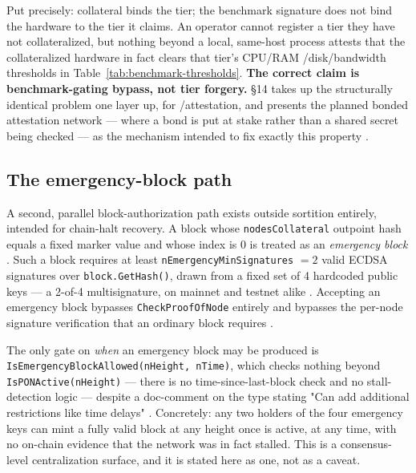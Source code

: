 Put precisely: collateral binds the tier; the benchmark signature does not bind the hardware to the
tier it claims. An operator cannot register a tier they have not collateralized, but nothing beyond a
local, same-host process attests that the collateralized hardware in fact clears that tier's CPU/RAM
/disk/bandwidth thresholds in Table~\ref{tab:benchmark-thresholds}. \textbf{The correct claim is
benchmark-gating bypass, not tier forgery.} \S14 takes up the structurally identical problem one layer
up, for \ArcaneOS/\SAS attestation, and presents the planned bonded attestation network — where a bond
is put at stake rather than a shared secret being checked — as the mechanism intended to fix exactly
this property \planned {}.

\subsection{The emergency-block path}
\label{sec:consensus-emergency}

A second, parallel block-authorization path exists outside \PoN sortition entirely, intended for
chain-halt recovery. A block whose \texttt{nodes\allowbreak{}Collateral} outpoint hash equals a fixed marker value
and whose index is 0 is treated as an \emph{emergency block}
\shipped {}. Such a block requires at least
\texttt{n\allowbreak{}Emergency\allowbreak{}Min\allowbreak{}Signatures} $= 2$ valid ECDSA signatures over \texttt{block.\allowbreak{}Get\allowbreak{}Hash()}, drawn from
a fixed set of 4 hardcoded public keys — a 2-of-4 multisignature, on mainnet and testnet alike
\shipped {}. Accepting an emergency block bypasses
\texttt{Check\allowbreak{}Proof\allowbreak{}Of\allowbreak{}Node} entirely \shipped {} and bypasses the
per-node signature verification that an ordinary \PoN block requires
\shipped {}.

The only gate on \emph{when} an emergency block may be produced is
\texttt{Is\allowbreak{}Emergency\allowbreak{}Block\allowbreak{}Allowed(n\allowbreak{}Height, n\allowbreak{}Time)}, which checks nothing beyond
\texttt{Is\allowbreak{}PONActive(n\allowbreak{}Height)} — there is no time-since-last-block check and no stall-detection logic
\shipped {} — despite a doc-comment on the type stating
"Can add additional restrictions like time delays"
\shipped {}. Concretely: any two holders of the four
emergency keys can mint a fully valid block at any height once \PoN is active, at any time, with no
on-chain evidence that the network was in fact stalled. This is a consensus-level centralization
surface, and it is stated here as one, not as a caveat.

